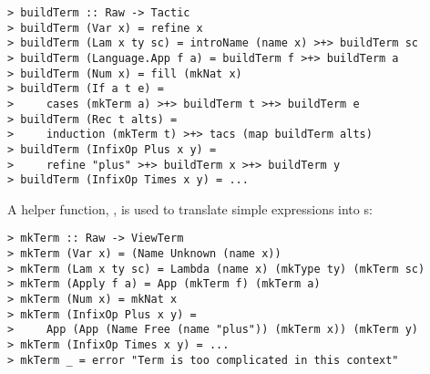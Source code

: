 \begin{verbatim}
> buildTerm :: Raw -> Tactic
> buildTerm (Var x) = refine x
> buildTerm (Lam x ty sc) = introName (name x) >+> buildTerm sc
> buildTerm (Language.App f a) = buildTerm f >+> buildTerm a
> buildTerm (Num x) = fill (mkNat x)
> buildTerm (If a t e) = 
>     cases (mkTerm a) >+> buildTerm t >+> buildTerm e
> buildTerm (Rec t alts) =
>     induction (mkTerm t) >+> tacs (map buildTerm alts)
> buildTerm (InfixOp Plus x y) = 
>     refine "plus" >+> buildTerm x >+> buildTerm y
> buildTerm (InfixOp Times x y) = ...
\end{verbatim}

A helper function, , is used to translate simple
expressions into s:

\begin{verbatim}
> mkTerm :: Raw -> ViewTerm
> mkTerm (Var x) = (Name Unknown (name x))
> mkTerm (Lam x ty sc) = Lambda (name x) (mkType ty) (mkTerm sc)
> mkTerm (Apply f a) = App (mkTerm f) (mkTerm a)
> mkTerm (Num x) = mkNat x
> mkTerm (InfixOp Plus x y) = 
>     App (App (Name Free (name "plus")) (mkTerm x)) (mkTerm y)
> mkTerm (InfixOp Times x y) = ...
> mkTerm _ = error "Term is too complicated in this context"
\end{verbatim}